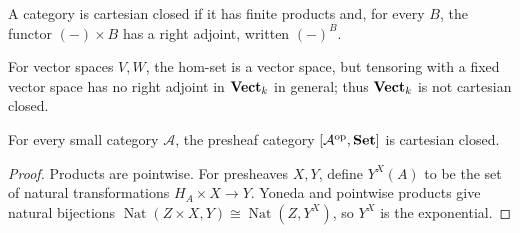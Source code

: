 \begin{definition}
\label{def:lbc-cartesian-closed}
A category is cartesian closed if it has finite products and, for every $B$, the
functor $(-)\times B$ has a right adjoint, written $(-)^B$.
\end{definition}

\begin{remark}
\label{rem:lbc-vect-not-closed}
For vector spaces $V,W$, the hom-set is a vector space, but tensoring with a
fixed vector space has no right adjoint in $\mathbf{Vect}_k$ in general; thus $\mathbf{Vect}_k$
is not cartesian closed.
\end{remark}

\begin{theorem}
\label{thm:lbc-presheaf-cartesian-closed}
For every small category $\mathcal A$, the presheaf category
$[\mathcal A^{\mathrm{op}},\mathbf{Set}]$ is cartesian closed.
\end{theorem}
\begin{proof}
Products are pointwise. For presheaves $X,Y$, define $Y^X(A)$ to be the set of
natural transformations $H_A\times X\to Y$. Yoneda and pointwise products
give natural bijections $\operatorname{Nat}(Z\times X,Y)\cong
\operatorname{Nat}(Z,Y^X)$, so $Y^X$ is the exponential.
\end{proof}
